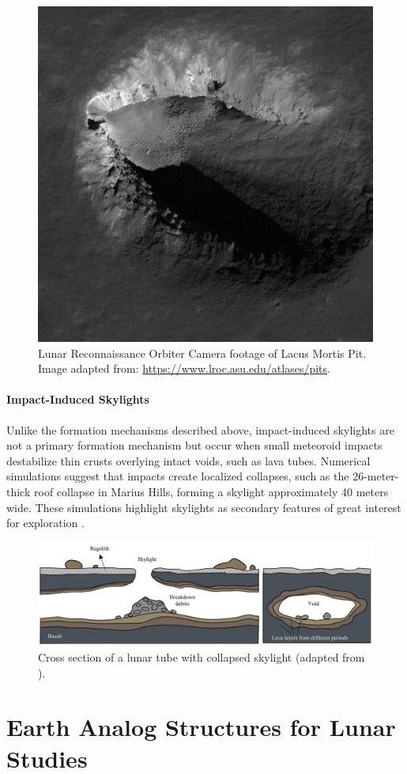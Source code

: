 \begin{figure}[H]
    \centering
    \includegraphics[width=0.33\linewidth]{lunar-pit-highland.png}
    \caption{Lunar Reconnaissance Orbiter Camera footage of Lacus Mortis Pit. Image adapted from: \url{https://www.lroc.asu.edu/atlases/pits}.}
    \label{fig:highland-lunar-pit}
\end{figure}

\paragraph{Impact-Induced Skylights}
Unlike the formation mechanisms described above, impact-induced skylights are not a primary formation mechanism but occur when small meteoroid impacts destabilize thin crusts overlying intact voids, such as lava tubes. Numerical simulations suggest that impacts create localized collapses, such as the 26-meter-thick roof collapse in Marius Hills, forming a skylight approximately 40 meters wide. These simulations highlight skylights as secondary features of great interest for exploration \cite{clrn-impact-melt, lunar-pits-numerical-modelling}.

\begin{figure}[H]
    \centering
    \includegraphics[width=0.99\linewidth]{lunar-pit-in-lava-tube.png}
    \caption{Cross section of a lunar tube with collapsed skylight (adapted from \cite{bases-feng}).}
    \label{fig:impact-induced-skylight}
\end{figure}


\section{Earth Analog Structures for Lunar Studies}

